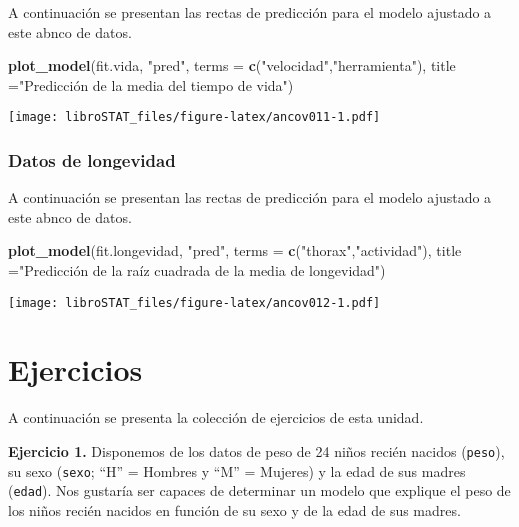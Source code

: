 \documentclass[
]{book}
\newenvironment{Shaded}{\begin{snugshade}}{\end{snugshade}}
\newcommand{\DataTypeTok}[1]{\textcolor[rgb]{0.13,0.29,0.53}{#1}}
\newcommand{\KeywordTok}[1]{\textcolor[rgb]{0.13,0.29,0.53}{\textbf{#1}}}
\newcommand{\NormalTok}[1]{#1}
\newcommand{\StringTok}[1]{\textcolor[rgb]{0.31,0.60,0.02}{#1}}
\theoremstyle{definition}
\theoremstyle{definition}
\theoremstyle{definition}
\theoremstyle{remark}
\begin{document}
A continuación se presentan las rectas de predicción para el modelo ajustado a este abnco de datos.

\begin{Shaded}
\begin{Highlighting}[]
\KeywordTok{plot_model}\NormalTok{(fit.vida, }\StringTok{"pred"}\NormalTok{, }\DataTypeTok{terms =} \KeywordTok{c}\NormalTok{(}\StringTok{"velocidad"}\NormalTok{,}\StringTok{"herramienta"}\NormalTok{),}
           \DataTypeTok{title =}\StringTok{"Predicción de la media del tiempo de vida"}\NormalTok{)}
\end{Highlighting}
\end{Shaded}

\texttt{[image: libroSTAT\_files/figure-latex/ancov011-1.pdf]}

\hypertarget{datos-de-longevidad-2}{%
\subsubsection{Datos de longevidad}\label{datos-de-longevidad-2}}

A continuación se presentan las rectas de predicción para el modelo ajustado a este abnco de datos.

\begin{Shaded}
\begin{Highlighting}[]
\KeywordTok{plot_model}\NormalTok{(fit.longevidad, }\StringTok{"pred"}\NormalTok{, }\DataTypeTok{terms =} \KeywordTok{c}\NormalTok{(}\StringTok{"thorax"}\NormalTok{,}\StringTok{"actividad"}\NormalTok{),}
           \DataTypeTok{title =}\StringTok{"Predicción de la raíz cuadrada de la media de longevidad"}\NormalTok{)}
\end{Highlighting}
\end{Shaded}

\texttt{[image: libroSTAT\_files/figure-latex/ancov012-1.pdf]}

\hypertarget{ejercicios}{%
\section{Ejercicios}\label{ejercicios}}

A continuación se presenta la colección de ejercicios de esta unidad.

\textbf{Ejercicio 1.} Disponemos de los datos de peso de 24 niños recién nacidos (\texttt{peso}), su sexo (\texttt{sexo}; ``H'' = Hombres y ``M'' = Mujeres) y la edad de sus madres (\texttt{edad}). Nos gustaría ser capaces de determinar un modelo que explique el peso de los niños recién nacidos en función de su sexo y de la edad de sus madres.
\end{document}
